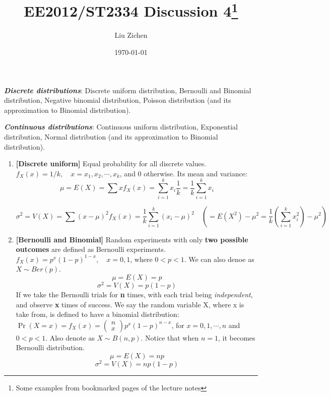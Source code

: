 \documentclass[a4paper]{article}
\title{EE2012/ST2334 Discussion 4\footnote{Some examples from bookmarked pages of the lecture notes}}
\author{Liu Zichen}
\date{\today}
\begin{document}
\maketitle

\textbf{\textit{Discrete distributions}}: Discrete uniform distribution, Bernoulli and Binomial distribution, Negative binomial distribution, Poisson distribution (and its approximation to Binomial distribution).


\textbf{\textit{Continuous distributions}}:
Continuous uniform distribution, Exponential distribution, Normal distribution (and its approximation to Binomial distribution).


\begin{enumerate}

\item
\textbf{[Discrete uniform]}
Equal probability for all discrete values. $f_{X}(x)=1 / k, \quad x=x_{1}, x_{2}, \cdots, x_{k}$, and 0 otherwise. Its mean and variance:
\begin{equation}
    \mu=E(X)=\sum x f_{X}(x)=\sum_{i=1}^{k} x_{i} \frac{1}{k}=\frac{1}{k} \sum_{i=1}^{k} x_{i} 
\end{equation} 

\begin{equation}
\sigma^{2}=V(X)=\sum(x-\mu)^{2} f_{X}(x)=\frac{1}{k} \sum_{i=1}^{k}\left(x_{i}-\mu\right)^{2} \quad (\mathcal{=}  E\left(X^{2}\right)-\mu^{2}=\frac{1}{k}\left(\sum_{i=1}^{k} x_{i}^{2}\right)-\mu^{2})
\end{equation}

\item
\textbf{[Bernoulli and Binomial]}
Random experiments with only \textbf{two possible outcomes} are defined as Bernoulli experiments. $f_{X}(x)=p^{x}(1-p)^{1-x}, \quad x=0,1$, where $0<p<1$. We can also denoe as $X \sim Ber(p)$.
\begin{equation}
\mu=E(X)=p
\end{equation}
\begin{equation}
\sigma^{2}=V(X)=p(1-p)
\end{equation}
If we take the Bernoulli trials for \textbf{n} times, with each trial being \textit{independent}, and observe \textbf{x} times of success. We say the random variable X, where x is take from, is defined to have a binomial distribution:
$\operatorname{Pr}(X=x)=f_{X}(x)=\left( \begin{array}{l}{n} \\ {x}\end{array}\right) p^{x}(1-p)^{n-x}$, for $x=0,1, \cdots, n$ and $0<p<1$. Also denote as $X \sim B(n, p)$. Notice that when $n=1$, it becomes Bernoulli distribution.
\begin{equation}
\mu=E(X)=n p
\end{equation}
\begin{equation}
\sigma^{2}=V(X)=n p(1-p)
\end{equation}


\end{enumerate}
\end{document}
